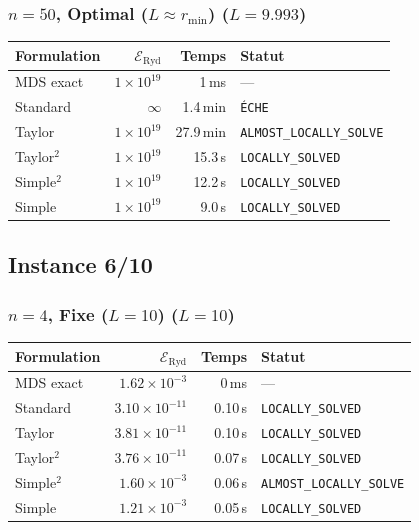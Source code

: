 \subsubsection{$n=50$, Optimal ($L{\approx}r_{\min}$) ($L=9.993$)}
\begin{longtable}{@{}lrrl@{}}
  \toprule
  Formulation & $\mathcal{E}_{\mathrm{Ryd}}$ & Temps & Statut \\
  \midrule
  \endhead
  MDS exact & $1\times10^{19}$ & 1\,ms & --- \\
  Standard & $\infty$ & 1.4\,min & \texttt{ÉCHE} \\
  Taylor & $1\times10^{19}$ & 27.9\,min & \texttt{ALMOST\_LOCALLY\_SOLVE} \\
  Taylor$^2$ & $1\times10^{19}$ & 15.3\,s & \texttt{LOCALLY\_SOLVED} \\
  Simple$^2$ & $1\times10^{19}$ & 12.2\,s & \texttt{LOCALLY\_SOLVED} \\
  Simple & $1\times10^{19}$ & 9.0\,s & \texttt{LOCALLY\_SOLVED} \\
  \bottomrule
\end{longtable}

\subsection{Instance 6/10}
\subsubsection{$n=4$, Fixe ($L{=}10$) ($L=10$)}
\begin{longtable}{@{}lrrl@{}}
  \toprule
  Formulation & $\mathcal{E}_{\mathrm{Ryd}}$ & Temps & Statut \\
  \midrule
  \endhead
  MDS exact & $1.62\times10^{-3}$ & 0\,ms & --- \\
  Standard & $3.10\times10^{-11}$ & 0.10\,s & \texttt{LOCALLY\_SOLVED} \\
  Taylor & $3.81\times10^{-11}$ & 0.10\,s & \texttt{LOCALLY\_SOLVED} \\
  Taylor$^2$ & $3.76\times10^{-11}$ & 0.07\,s & \texttt{LOCALLY\_SOLVED} \\
  Simple$^2$ & $1.60\times10^{-3}$ & 0.06\,s & \texttt{ALMOST\_LOCALLY\_SOLVE} \\
  Simple & $1.21\times10^{-3}$ & 0.05\,s & \texttt{LOCALLY\_SOLVED} \\
  \bottomrule
\end{longtable}

